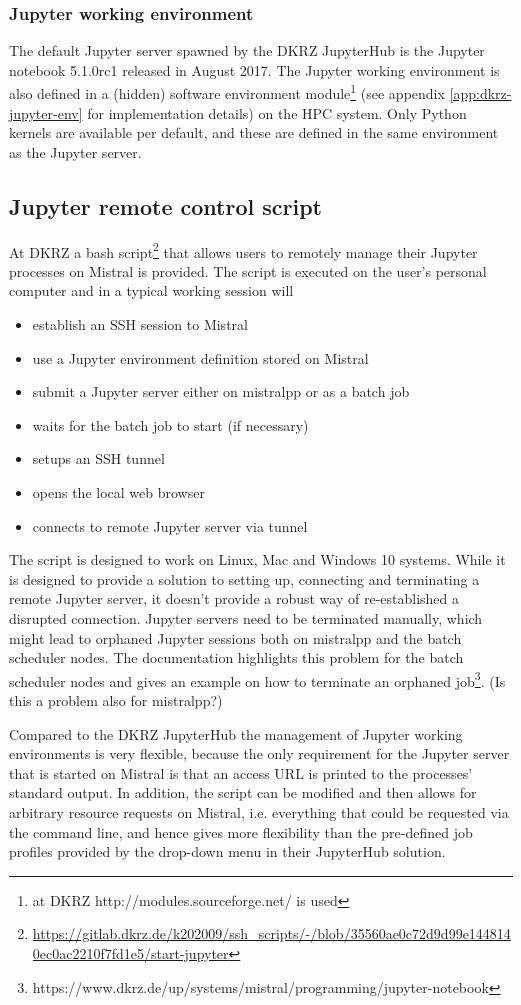 \subsubsection{Jupyter working environment}

The default Jupyter server spawned by the DKRZ JupyterHub is the Jupyter notebook 5.1.0rc1 released in August 2017.
The Jupyter working environment is also defined in a (hidden) software environment module\footnote{at DKRZ http://modules.sourceforge.net/ is used} (see appendix \ref{app:dkrz-jupyter-env} for implementation details) on the HPC system.
Only Python kernels are available per default, and these are defined in the same environment as the Jupyter server.

\subsection{Jupyter remote control script}

At DKRZ a bash script\footnote{\url{https://gitlab.dkrz.de/k202009/ssh_scripts/-/blob/35560ae0c72d9d99e1448140ec0ac2210f7fd1e5/start-jupyter}} that allows users to remotely manage their Jupyter processes on Mistral is provided.
The script is executed on the user's personal computer and in a typical working session will
\begin{itemize}
    \item establish an SSH session to Mistral
    \item use a Jupyter environment definition stored on Mistral
    \item submit a Jupyter server either on mistralpp or as a batch job
    \item waits for the batch job to start (if necessary)
    \item setups an SSH tunnel
    \item opens the local web browser
    \item connects to remote Jupyter server via tunnel
\end{itemize}

The script is designed to work on Linux, Mac and Windows 10 systems.
While it is designed to provide a solution to setting up, connecting and terminating a remote Jupyter server, it doesn't provide a robust way of re-established a disrupted connection.
Jupyter servers need to be terminated manually, which might lead to orphaned Jupyter sessions both on mistralpp and the batch scheduler nodes.
The documentation highlights this problem for the batch scheduler nodes and gives an example on how to terminate an orphaned job\footnote{https://www.dkrz.de/up/systems/mistral/programming/jupyter-notebook}.
(Is this a problem also for mistralpp?)

Compared to the DKRZ JupyterHub the management of Jupyter working environments is very flexible, because the only requirement for the Jupyter server that is started on Mistral is that an access URL is printed to the processes' standard output.
In addition, the script can be modified and then allows for arbitrary resource requests on Mistral, i.e. everything that could be requested via the command line, and hence gives more flexibility than the pre-defined job profiles provided by the drop-down menu in their JupyterHub solution.
